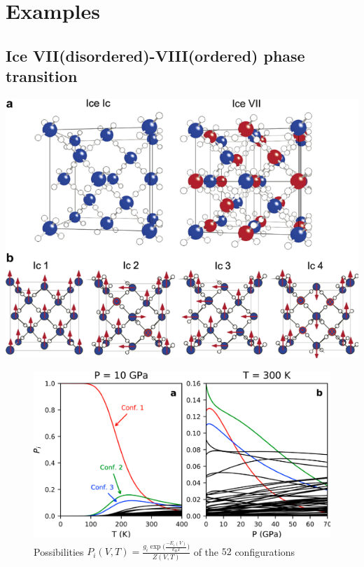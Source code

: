 \documentclass[13pt,aspectratio=169]{beamer}
\newcommand*{\RMN}[1]{\uppercase\expandafter{\romannumeral#1}}
\begin{document}
\section{Examples}

\subsection{Ice VII(disordered)-VIII(ordered) phase transition}
\begin{frame}{\subsecname{} \RMN{1}}
	\centering
	\includegraphics[height=0.9\textheight]{images/ice7}%
\end{frame}

\begin{frame}{\subsecname{} \RMN{2}}
	\begin{figure}
		\includegraphics[height=0.75\textheight]{images/ice_prob}%
		\caption{Possibilities $P_i(V, T) = \frac{g_i \exp\Big(\frac{-E_i(V)}{k_B T}\Big)}{Z(V, T)}$ of the $52$ configurations}
	\end{figure}
\end{frame}
\end{document}
